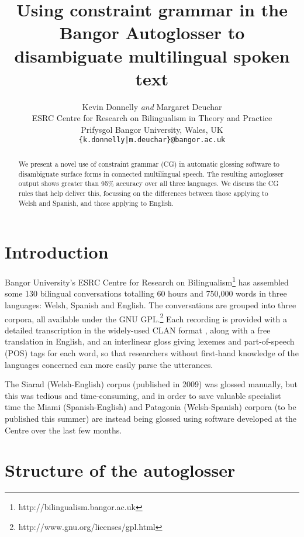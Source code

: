 \documentclass[11pt]{article}
\title{Using constraint grammar in the Bangor Autoglosser to disambiguate multilingual spoken text}
\author{Kevin Donnelly \textit{and} Margaret Deuchar\\
  ESRC Centre for Research on Bilingualism in Theory and Practice\\
  Prifysgol Bangor University, Wales, UK\\
  {\tt \{k.donnelly|m.deuchar\}@bangor.ac.uk}  }
\date{}
\begin{document}
\maketitle
\begin{abstract}
We present a novel use of constraint grammar (CG) in automatic glossing software to disambiguate surface forms in connected multilingual speech.  The resulting autoglosser output shows greater than 95\% accuracy over all three languages.  We discuss the CG rules that help deliver this, focussing on the differences between those applying to Welsh and Spanish, and those applying to English.
\end{abstract}

\section{Introduction}
\label{sec:intro}

Bangor University's ESRC Centre for Research on Bilingualism\footnote{http://bilingualism.bangor.ac.uk} has assembled some 130 bilingual conversations totalling 60 hours and 750,000 words in three languages: Welsh, Spanish and English.  The conversations are grouped into three corpora, all available under the GNU GPL.\footnote{http://www.gnu.org/licenses/gpl.html}  Each recording is provided with a detailed transcription in the widely-used CLAN format \cite{macwhinney2000}, along with a free translation in English, and an interlinear gloss giving lexemes and part-of-speech (POS) tags for each word, so that researchers without first-hand knowledge of the languages concerned can more easily parse the utterances.

The Siarad (Welsh-English) corpus (published in 2009) was glossed manually, but this was tedious and time-consuming, and in order to save valuable specialist time the Miami (Spanish-English) and Patagonia (Welsh-Spanish) corpora (to be published this summer) are instead being glossed using software developed at the Centre over the last few months.

\section{Structure of the autoglosser}
\label{sec:autoglosser}
\end{document}
